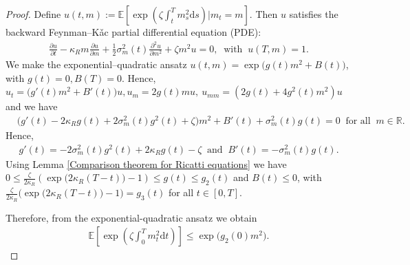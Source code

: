 \documentclass[12,reqno]{amsart}
\numberwithin{equation}{section}
\begin{document}
\begin{proof}
	Define $u(t,m):=\mathbb{E}\left[\exp\left(\zeta\int_{t}^{T}m_{s}^{2}\mathrm{d}s\right)\big|m_{t}=m\right]$. Then $u$ satisfies the backward Feynman–K{\v a}c partial differential equation (PDE):
	\begin{align}
		\frac{\partial u}{\partial t}-\kappa_{R}m\frac{\partial u}{\partial m} +\frac{1}{2}\sigma_{m}^{2}(t)\frac{\partial^2 u}{\partial m^2}+\zeta m^{2}u=0,~\text{ with }~u(T,m)=1.
	\end{align}
	We make the exponential–quadratic ansatz $u(t,m)=\exp\big(g(t)m^{2}+B(t)\big)$, with $g(t)=0,B(T)=0$. Hence, $u_{t}=\big(g'(t)m^{2}+B'(t)\big)u,u_{m}=2g(t)mu,~u_{mm}=(2g(t)+4g^{2}(t)m^{2})u$ and we have
	\begin{align}
		&\big(g'(t)-2\kappa_{R}g(t)+2\sigma_{m}^{2}(t)g^{2}(t)+\zeta\big)m^{2}+B'(t)+\sigma_{m}^{2}(t)g(t)=0~\text{ for all }~m\in\mathbb{R}.
	\end{align}
	Hence,
	\begin{align}
		g'(t)=-2\sigma_{m}^{2}(t)g^{2}(t)+2\kappa_{R}g(t)-\zeta~\text{ and }~ B'(t)=-\sigma_{m}^{2}(t)g(t).
	\end{align}
	Using Lemma \ref{Comparison theorem for Ricatti equations} we have $0\le\frac{\zeta}{2\kappa_{R}}\left(\exp\big(2\kappa_{R}(T-t)\big)-1\right)\le g(t)\le g_{2}(t)$ and $B(t)\le0$, with $\frac{\zeta}{2\kappa_{R}}\big(\exp\big(2\kappa_{R}(T-t)\big)-1\big)=g_{3}(t)$ for all $t\in[0,T]$.
	
	Therefore, from the exponential-quadratic ansatz we obtain
	\begin{align}\label{E1_Lemma B3}
		\mathbb{E}\left[\exp\left(\zeta\int_{0}^{T}m_{t}^{2}\mathrm{d}t\right)\right]\le\exp\big(g_{2}(0)m^{2}\big).
	\end{align}
	

\end{proof}
\end{document}
